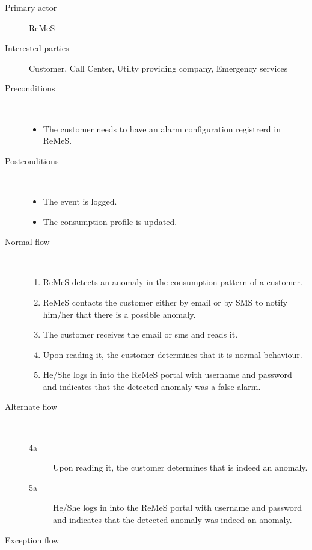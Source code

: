 \begin{description}
	\item[Primary actor] ReMeS
	\item[Interested parties] Customer, Call Center, Utilty providing company,
	Emergency services
	\item[Preconditions] \ 
	\begin{itemize}
		\item The customer needs to have an alarm configuration registrerd in ReMeS.
	\end{itemize}
	\item[Postconditions] \ 
	\begin{itemize}
		\item The event is logged.
		\item The consumption profile is updated.
	\end{itemize}
	\item[Normal flow] \ 
	\begin{enumerate}
	  	\item ReMeS detects an anomaly in the consumption pattern of a customer.
	  	\item ReMeS contacts the customer either by email or by SMS to notify
	  	him/her that there is a possible anomaly.
	  	\item The customer receives the email or sms and reads it.
	  	\item Upon reading it, the customer determines that it is normal behaviour.
	  	\item He/She logs in into the ReMeS portal with username and password and
	  	indicates that the detected anomaly was a false alarm.
	\end{enumerate}
	\item[Alternate flow] \ 
	\begin{description}
		\item[4a] Upon reading it, the customer determines that is indeed an anomaly.
		\item[5a] He/She logs in into the ReMeS portal with username and password and
	  	indicates that the detected anomaly was indeed an anomaly.
	\end{description}
	\item[Exception flow] \ 
	\begin{description}
		\item
	\end{description}
\end{description}